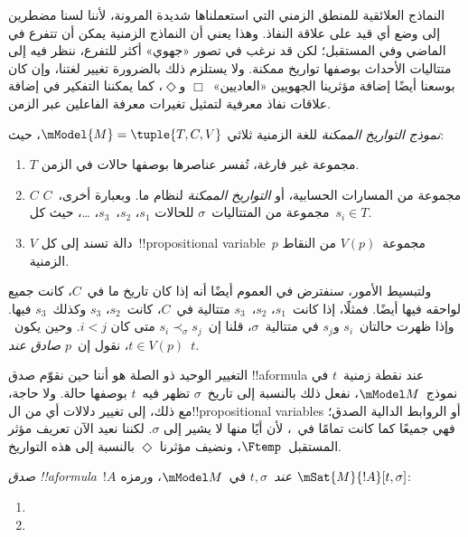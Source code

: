 \documentclass[../../../include/open-logic-section]{subfiles}
\begin{document}


النماذج العلائقية للمنطق الزمني التي استعملناها شديدة المرونة، لأننا لسنا
مضطرين إلى وضع أي قيد على علاقة النفاذ. وهذا يعني أن النماذج الزمنية يمكن
أن تتفرع في الماضي وفي المستقبل؛ لكن قد نرغب في تصور «جهوي» أكثر للتفرع،
ننظر فيه إلى متتاليات الأحداث بوصفها تواريخ ممكنة. ولا يستلزم ذلك بالضرورة
تغيير لغتنا، وإن كان بوسعنا أيضًا إضافة مؤثرينا الجهويين «العاديين»~$\Box$
و$\Diamond$، كما يمكننا التفكير في إضافة علاقات نفاذ معرفية لتمثيل تغيرات
معرفة الفاعلين عبر الزمن.

\begin{defn}
  \emph{نموذج التواريخ الممكنة} للغة الزمنية ثلاثي
  $\mModel{M}=\tuple{T,C,V}$، حيث:
  \begin{enumerate}
    \item $T$ مجموعة غير فارغة، تُفسر عناصرها بوصفها حالات في الزمن.
    \item $C$ مجموعة من المسارات الحسابية، أو \emph{التواريخ الممكنة}
      لنظام ما. وبعبارة أخرى،~$C$ مجموعة من المتتاليات~$\sigma$ للحالات
      $s_1$، $s_2$،~$s_3$، \dots، حيث كل~$s_i \in T$.
    \item $V$ دالة تسند إلى كل~!!{propositional
      variable}~$p$ مجموعة~$V(p)$ من النقاط الزمنية.
  \end{enumerate}
  ولتبسيط الأمور، سنفترض في العموم أيضًا أنه إذا كان تاريخ ما في~$C$، كانت
  جميع لواحقه فيها أيضًا. فمثلًا، إذا كانت~$s_1$، $s_2$،~$s_3$ متتالية
  في~$C$، كانت~$s_2$، $s_3$ وكذلك~$s_3$ فيها. وإذا ظهرت حالتان~$s_i$
  و$s_j$ في متتالية~$\sigma$، قلنا إن~$s_i \prec_\sigma s_j$ متى كان
  $i<j$. وحين يكون~$t \in V(p)$، نقول إن~$p$ \emph{صادق عند}~$t$.
\end{defn}

التغيير الوحيد ذو الصلة هو أننا حين نقوّم صدق !!a{formula} عند نقطة
زمنية~$t$ في نموذج~$\mModel M$، نفعل ذلك بالنسبة إلى تاريخ~$\sigma$
تظهر فيه~$t$ بوصفها حالة. ولا حاجة، مع ذلك، إلى تغيير دلالات أي من
ال!!{propositional variable}s أو الروابط الدالية الصدق؛ فهي جميعًا كما
كانت تمامًا في~، لأن أيًا منها لا يشير إلى
$\sigma$. لكننا نعيد الآن تعريف مؤثر المستقبل~$\Ftemp$، ونضيف مؤثرنا
$\Diamond$ بالنسبة إلى هذه التواريخ.

\begin{defn}
  \emph{صدق !!a{formula}~$!A$ عند~$t,\sigma$} في~$\mModel M$، ورمزه
  $\mSat{M}{!A}[t,\sigma]$:
  \begin{enumerate}
  \item{} 
  \item{} 
  \end{enumerate}
\end{defn}
\end{document}
